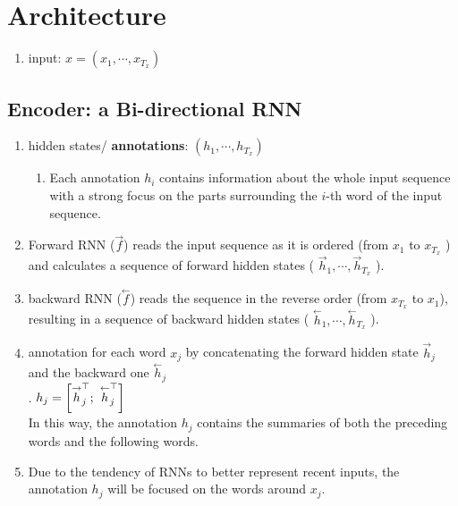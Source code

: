 \section{Architecture}


\begin{enumerate}
    \item input: $x = (x_1, \cdots, x_{T_x})$
    \hfill \cite{adv-ml-tech/paper/arxiv.org/1409.0473}
\end{enumerate}

\subsection{Encoder: a Bi-directional RNN}

\begin{enumerate}
    \item hidden states/ \textbf{annotations}: $(h_1, \cdots, h_{T_x})$
    \hfill \cite{adv-ml-tech/paper/arxiv.org/1409.0473}
    \begin{enumerate}
        \item  Each annotation $h_i$ contains information about the whole input sequence with a strong focus on the parts surrounding the $i$-th word of the input sequence.
        \hfill \cite{adv-ml-tech/paper/arxiv.org/1409.0473}
    \end{enumerate}


    \item Forward RNN ($\overset{\rightarrow}{f}$) reads the input sequence as it is ordered (from $x_1$ to $x_{T_x}$ ) and calculates a sequence of forward hidden states ( $\overset{\rightarrow}{h}_1, \cdots , \overset{\rightarrow}{h}_{T_x}$ ).
    \hfill \cite{adv-ml-tech/paper/arxiv.org/1409.0473}

    \item backward RNN ($\overset{\leftarrow}{f}$) reads the sequence in the reverse order (from $x_{T_x}$ to $x_1$), resulting in a sequence of backward hidden states ( $\overset{\leftarrow}{h}_1, \cdots , \overset{\leftarrow}{h}_{T_x}$ ).
    \hfill \cite{adv-ml-tech/paper/arxiv.org/1409.0473}

    \item  annotation for each word $x_j$ by concatenating the forward hidden state $\overset{\rightarrow}{h} _j$ and the backward one $\overset{\leftarrow}{h} _j$
    \hfill \cite{adv-ml-tech/paper/arxiv.org/1409.0473}
    \\
    .\hfill
    $
        h_j = \left[
            \overset{\rightarrow}{h} _j^\top ; \
            \overset{\leftarrow}{h} _j^\top
        \right]
    $
    \hfill \cite{adv-ml-tech/paper/arxiv.org/1409.0473}
    \\
    In this way, the annotation $h_j$ contains the summaries of both the preceding words and the following words.
    \hfill \cite{adv-ml-tech/paper/arxiv.org/1409.0473}

    \item Due to the tendency of RNNs to better represent recent inputs, the annotation $h_j$ will be focused on the words around $x_j$.
    \hfill \cite{adv-ml-tech/paper/arxiv.org/1409.0473}
\end{enumerate}

